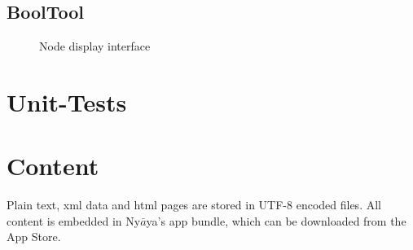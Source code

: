 \subsection{BoolTool}

\begin{figure}[htbp]
\begin{center}
\caption{Node display interface}
\label{fig:NyayaNodeDisplay}
\end{center}
\end{figure}

\section{Unit-Tests}

\section{Content}

Plain text, xml data and html pages are stored in UTF-8 encoded files. 
All content is embedded in Ny$\bar{a}$ya's app bundle,
which can be downloaded from the App Store. 



